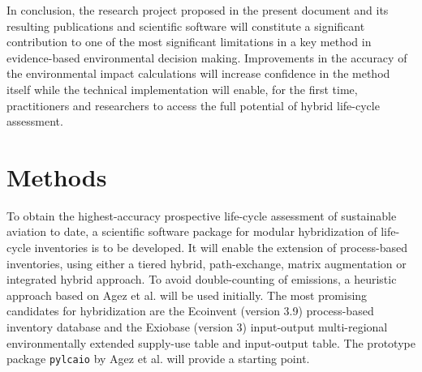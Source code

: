 \documentclass{article}
\begin{document}
    In conclusion, the research project proposed in the present document and its resulting publications and scientific software will constitute a significant contribution to one of the most significant limitations in a key method in evidence-based environmental decision making. Improvements in the accuracy of the environmental impact calculations will increase confidence in the method itself while the technical implementation will enable, for the first time, practitioners and researchers to access the full potential of hybrid life-cycle assessment.

    
    
    
\section{Methods}

    To obtain the highest-accuracy prospective life-cycle assessment of sustainable aviation to date, a scientific software package for modular hybridization of life-cycle inventories is to be developed. It will enable the extension of process-based inventories, using either a tiered hybrid, path-exchange, matrix augmentation or integrated hybrid \cite{hauschild_life_2015}\cite{hauschild_life_2018}\cite{crawford_hybrid_2018} approach. To avoid double-counting of emissions, a heuristic approach based on Agez et al. \cite{agez_lifting_2019}\cite{agez_correcting_2022}\cite{agez_hybridization_2020} will be used initially. The most promising candidates for hybridization are the Ecoinvent (version 3.9) process-based inventory database and the Exiobase (version 3) input-output multi-regional environmentally extended supply-use  table and input-output table. The prototype package \texttt{pylcaio} by Agez et al. \cite{noauthor_pylcaio_2022} will provide a starting point.
    
\end{document}
